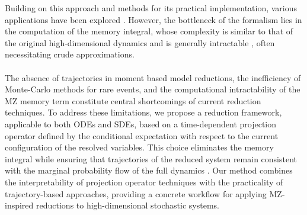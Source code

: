 \documentclass[11pt, a4paper, oneside, reqno]{amsart}
\begin{document}
Building on this approach and methods for its practical implementation, various applications have been explored \cite{WANG2020109402,LIN2021109864,jeong2024diffgledifferentiablecoarsegraineddynamics,Parish}.
However, the bottleneck of the formalism lies in the computation of the memory integral, whose complexity is similar to that of the original high-dimensional dynamics and is generally intractable \cite{gouasmi2017memory}, often necessitating crude approximations.  \\ \ \\ 
The absence of trajectories in moment based model reductions, the inefficiency of Monte-Carlo methods for rare events, and the computational intractability of the MZ memory term constitute central shortcomings of current reduction techniques. To address these limitations, we propose a reduction framework, applicable to both ODEs and SDEs, based on a time-dependent projection operator defined by the conditional expectation with respect to the current configuration of the resolved variables. This choice eliminates the memory integral while ensuring that trajectories of the reduced system remain consistent with the marginal probability flow of the full dynamics \cite{gyongy1986mimicking, brunick2013mimicking}. Our method combines the interpretability of projection operator techniques with the practicality of trajectory-based approaches, providing a concrete workflow for applying MZ-inspired reductions to high-dimensional stochastic systems.
\end{document}

